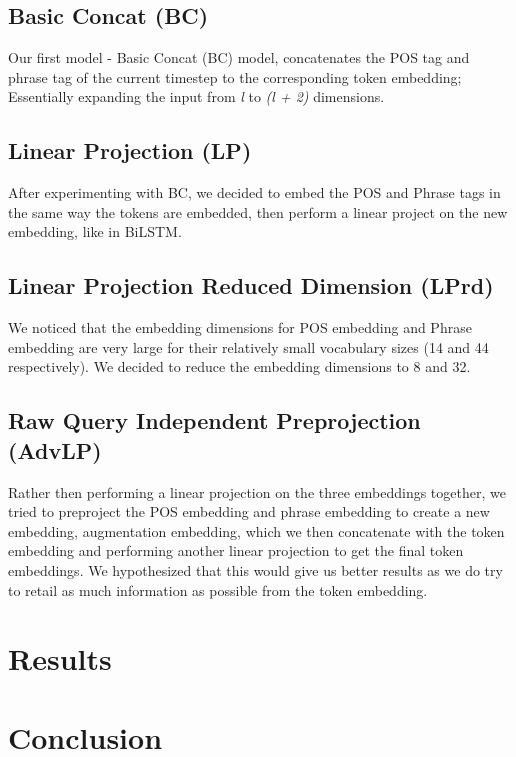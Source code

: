 \documentclass{IEEEtran}
\begin{document}
      \subsection{Basic Concat (BC)}
      Our first model - Basic Concat (BC) model, concatenates the POS tag and phrase tag of the 
      current timestep to the corresponding token embedding; Essentially expanding the input
      from \textit{l} to \textit{(l + 2)} dimensions.

      \subsection{Linear Projection (LP)}
      After experimenting with BC, we decided to embed the POS and Phrase tags in the same way the
      tokens are embedded, then perform a linear project on the new embedding, like in BiLSTM.

      \subsection{Linear Projection Reduced Dimension (LPrd)}
      We noticed that the embedding dimensions for POS embedding and Phrase embedding are very
      large for their relatively small vocabulary sizes (14 and 44 respectively). We decided to 
      reduce the embedding dimensions to 8 and 32.

      \subsection{Raw Query Independent Preprojection (AdvLP)}
      Rather then performing a linear projection on the three embeddings together, we tried to 
      preproject the POS embedding and phrase embedding to create a new embedding, augmentation
      embedding, which we then concatenate with the token embedding and performing another
      linear projection to get the final token embeddings. We hypothesized that this would 
      give us better results as we do try to retail as much information as possible from the
      token embedding. 

    \section{Results}
    \blindtext

    \section{Conclusion}
    \blindtext

\end{document}
